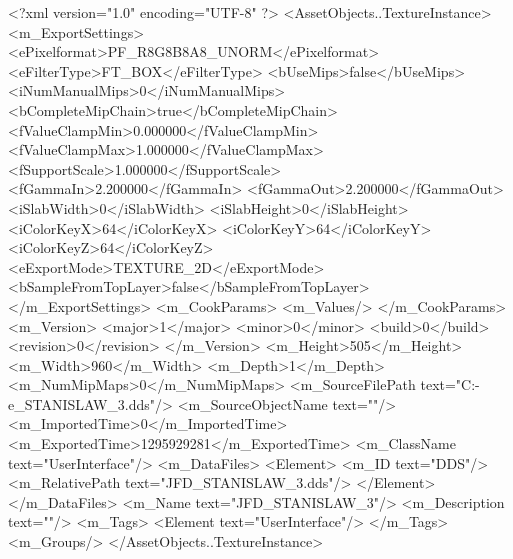 <?xml version="1.0" encoding="UTF-8" ?>
<AssetObjects..TextureInstance>
	<m_ExportSettings>
		<ePixelformat>PF_R8G8B8A8_UNORM</ePixelformat>
		<eFilterType>FT_BOX</eFilterType>
		<bUseMips>false</bUseMips>
		<iNumManualMips>0</iNumManualMips>
		<bCompleteMipChain>true</bCompleteMipChain>
		<fValueClampMin>0.000000</fValueClampMin>
		<fValueClampMax>1.000000</fValueClampMax>
		<fSupportScale>1.000000</fSupportScale>
		<fGammaIn>2.200000</fGammaIn>
		<fGammaOut>2.200000</fGammaOut>
		<iSlabWidth>0</iSlabWidth>
		<iSlabHeight>0</iSlabHeight>
		<iColorKeyX>64</iColorKeyX>
		<iColorKeyY>64</iColorKeyY>
		<iColorKeyZ>64</iColorKeyZ>
		<eExportMode>TEXTURE_2D</eExportMode>
		<bSampleFromTopLayer>false</bSampleFromTopLayer>
	</m_ExportSettings>
	<m_CookParams>
		<m_Values/>
	</m_CookParams>
	<m_Version>
		<major>1</major>
		<minor>0</minor>
		<build>0</build>
		<revision>0</revision>
	</m_Version>
	<m_Height>505</m_Height>
	<m_Width>960</m_Width>
	<m_Depth>1</m_Depth>
	<m_NumMipMaps>0</m_NumMipMaps>
	<m_SourceFilePath text="C:\Users\Deo-e\Desktop\JFD_STANISLAW_3.dds"/>
	<m_SourceObjectName text=""/>
	<m_ImportedTime>0</m_ImportedTime>
	<m_ExportedTime>1295929281</m_ExportedTime>
	<m_ClassName text="UserInterface"/>
	<m_DataFiles>
		<Element>
			<m_ID text="DDS"/>
			<m_RelativePath text="JFD_STANISLAW_3.dds"/>
		</Element>
	</m_DataFiles>
	<m_Name text="JFD_STANISLAW_3"/>
	<m_Description text=""/>
	<m_Tags>
		<Element text="UserInterface"/>
	</m_Tags>
	<m_Groups/>
</AssetObjects..TextureInstance>

